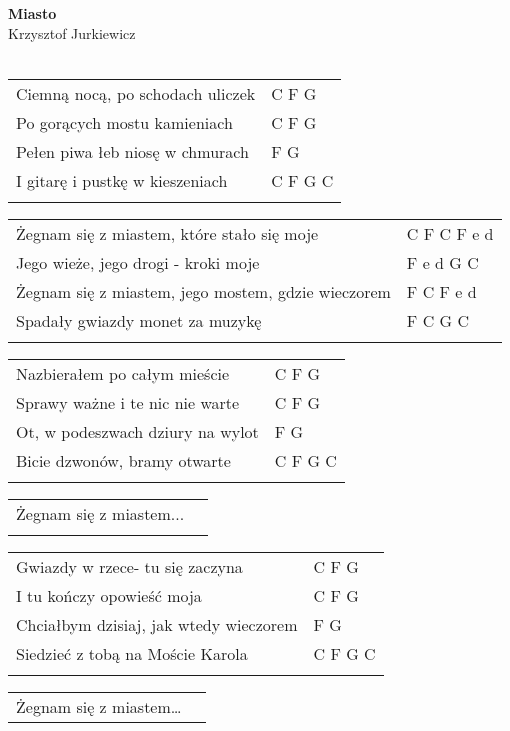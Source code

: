 \documentclass[a5paper]{article}
\begin{document}


\noindent
\fontsize{12pt}{15pt}\selectfont
\textbf{Miasto} \\
\fontsize{8pt}{10pt}\selectfont
Krzysztof Jurkiewicz \\ \\
\fontsize{10pt}{12pt}\selectfont
{}
\begin{tabular}{@{}p{9.00cm}p{3cm}@{}}
\noindent
Ciemną nocą, po schodach uliczek & C F G  \\
Po gorących mostu kamieniach & C F G \\
Pełen piwa łeb niosę w chmurach & F G  \\
I gitarę i pustkę w kieszeniach & C F G C \\ \\
\end{tabular}

\noindent
\begin{tabular}{@{}p{8.00cm}p{3cm}@{}}
Żegnam się z miastem, które stało się moje & C F C F e d  \\
Jego wieże, jego drogi - kroki moje & F e d G C  \\
Żegnam się z miastem, jego mostem, gdzie wieczorem & F C F e d \\
Spadały gwiazdy monet za muzykę & F C G C \\ \\
\end{tabular}

\noindent
\begin{tabular}{@{}p{9.00cm}p{3cm}@{}}
Nazbierałem po całym mieście & C F G \\
Sprawy ważne i te nic nie warte & C F G \\
Ot, w podeszwach dziury na wylot & F G \\
Bicie dzwonów, bramy otwarte & C F G C  \\ \\
\end{tabular}

\noindent
\begin{tabular}{@{}p{8.00cm}p{3cm}@{}}
Żegnam się z miastem... \\ \\
\end{tabular}

\noindent
\begin{tabular}{@{}p{9.00cm}p{3cm}@{}}
Gwiazdy w rzece- tu się zaczyna & C F G \\
I tu kończy opowieść moja & C F G \\
Chciałbym dzisiaj, jak wtedy wieczorem & F G  \\
Siedzieć z tobą na Moście Karola & C F G C  \\ \\
\end{tabular}

\noindent
\begin{tabular}{@{}p{8.00cm}p{3cm}@{}}
Żegnam się z miastem…
\end{tabular}
\end{document}
